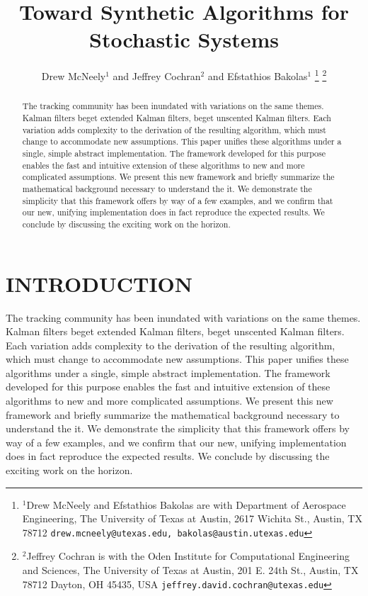 \documentclass[letterpaper, 10 pt, conference]{ieeeconf}  %
\title{\LARGE \bf
Toward Synthetic Algorithms for Stochastic Systems
}
\author{Drew McNeely$^{1}$ and Jeffrey Cochran$^{2}$ and Efstathios Bakolas$^{1}$%
\thanks{$^{1}$Drew McNeely and Efstathios Bakolas are with Department of Aerospace Engineering, 
        The University of Texas at Austin, 2617 Wichita St., Austin, TX 78712
        {\tt\small drew.mcneely@utexas.edu, bakolas@austin.utexas.edu}}%
\thanks{$^{2}$Jeffrey Cochran is with the Oden Institute for Computational Engineering and Sciences, The University of Texas at Austin, 201 E. 24th St., Austin, TX 78712
        Dayton, OH 45435, USA
        {\tt\small jeffrey.david.cochran@utexas.edu}}%
}
\begin{document}
\maketitle
\thispagestyle{empty}
\pagestyle{empty}


\begin{abstract}
The tracking community has been inundated with variations on the same themes. Kalman filters beget extended Kalman filters, beget unscented Kalman filters. Each variation adds complexity to the derivation of the resulting algorithm, which must change to accommodate new assumptions. This paper unifies these algorithms under a single, simple abstract implementation. The framework developed for this purpose enables the fast and intuitive extension of these algorithms to new and more complicated assumptions. We present this new framework and briefly summarize the mathematical background necessary to understand the it. We demonstrate the simplicity that this framework offers by way of a few examples, and we confirm that our new, unifying implementation does in fact reproduce the expected results. We conclude by discussing the exciting work on the horizon. 

\end{abstract}


\section{INTRODUCTION}

The tracking community has been inundated with variations on the same themes. Kalman filters beget extended Kalman filters, beget unscented Kalman filters. Each variation adds complexity to the derivation of the resulting algorithm, which must change to accommodate new assumptions. This paper unifies these algorithms under a single, simple abstract implementation. The framework developed for this purpose enables the fast and intuitive extension of these algorithms to new and more complicated assumptions. We present this new framework and briefly summarize the mathematical background necessary to understand the it. We demonstrate the simplicity that this framework offers by way of a few examples, and we confirm that our new, unifying implementation does in fact reproduce the expected results. We conclude by discussing the exciting work on the horizon.
\end{document}
